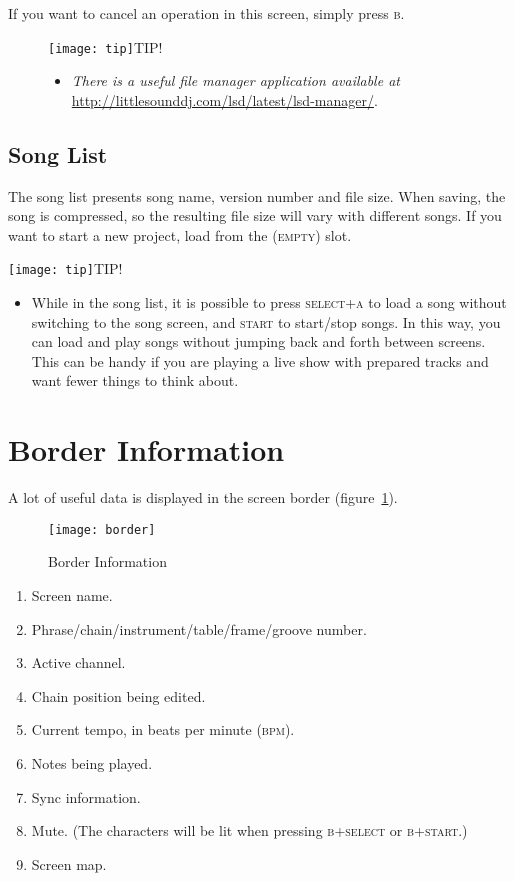 If you want to cancel an operation in this screen, simply press \textsc{b}.

\begin{figure}[hbtp]
\texttt{[image: tip]}TIP!
\begin{itemize}
        \item \textit{There is a useful file manager application available at} \url{http://littlesounddj.com/lsd/latest/lsd-manager/}.
	\end{itemize}
\end{figure}

\subsection{Song List}

The song list presents song name, version number and file size. When saving, the song is compressed, so the resulting file size will vary with different songs. If you want to start a new project, load from the \textsc{(empty)} slot.

\texttt{[image: tip]}TIP!
\begin{itemize}
    \item{While in the song list, it is possible to press \textsc{select+a} to load a song without switching to the song screen, and \textsc{start} to start/stop songs. In this way, you can load and play songs without jumping back and forth between screens. This can be handy if you are playing a live show with prepared tracks and want fewer things to think about.}
\end{itemize}

\section{Border Information}

A lot of useful data is displayed in the screen border (figure~\ref{fig:border}).

\begin{figure}[htpb]
	\begin{center}
	\texttt{[image: border]}
	\end{center}
	\caption{Border Information}
	\label{fig:border}
\end{figure}

\begin{enumerate}
\item Screen name.
\item Phrase/chain/instrument/table/frame/groove number.
\item Active channel.
\item Chain position being edited.
\item Current tempo, in beats per minute (\textsc{bpm}).
\item Notes being played.
\item Sync information.
\item Mute. (The characters will be lit when pressing \textsc{b+select} or \textsc{b+start}.)
\item Screen map.
\end{enumerate}


